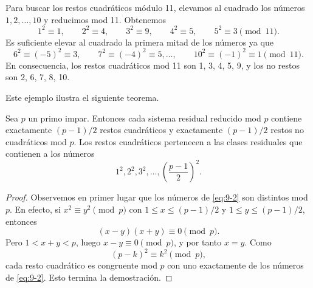 \documentclass[12pt,a4paper]{book}
\begin{document}
    \begin{ejemplo}
        Para buscar los restos cuadráticos módulo 11, elevamos al cuadrado los números
        $1,2,\dots,10$ y reducimos mod 11. Obtenemos
        \begin{equation*}
            1^{2}\equiv1,\qquad2^{2}\equiv4,\qquad3^{2}\equiv9,\qquad4^{2}\equiv5,\qquad
            5^{2}\equiv3\pmod{11}.
        \end{equation*}
        Es suficiente elevar al cuadrado la primera mitad de los números ya que
        \begin{equation*}
            6^{2}\equiv(-5)^{2}\equiv3,\qquad7^{2}\equiv(-4)^{2}\equiv5,\dots,\qquad
            10^{2}\equiv(-1)^{2}\equiv1\pmod{11}.
        \end{equation*}
        En consecuencia, los restos cuadráticos mod 11 son 1, 3, 4, 5, 9, y los no restos
        son 2, 6, 7, 8, 10.
    \end{ejemplo}

    Este ejemplo ilustra el siguiente teorema.

    \begin{teorema}\label{teo:9-1}
        Sea $p$ un primo impar. Entonces cada sistema residual reducido mod $p$ contiene
        exactamente $(p-1)/2$ restos cuadráticos y exactamente $(p-1)/2$ restos no
        cuadráticos mod $p$. Los restos cuadráticos pertenecen a las clases residuales que
        contienen a los números
        \begin{equation}\label{eq:9-2}
            1^{2},2^{2},3^{2},\dots,\left(\frac{p-1}{2}\right)^{2}.
        \end{equation}
    \end{teorema}

    \begin{proof}
        Observemos en primer lugar que los números de \eqref{eq:9-2} son distintos mod $p$.
        En efecto, si $x^{2}\equiv y^{2}\pmod{p}$ con $1\leq x\leq(p-1)/2$ y
        $1\leq y\leq(p-1)/2$, entonces
        \begin{equation*}
            (x-y)(x+y)\equiv0\pmod{p}.
        \end{equation*}
        Pero $1<x+y<p$, luego $x-y\equiv0\pmod{p}$, y por tanto $x=y$. Como
        \begin{equation*}
            (p-k)^{2}\equiv k^{2}\pmod{p},
        \end{equation*}
        cada resto cuadrático es congruente mod $p$ con uno exactamente de los números de
        \eqref{eq:9-2}. Esto termina la demostración.
    \end{proof}
\end{document}
